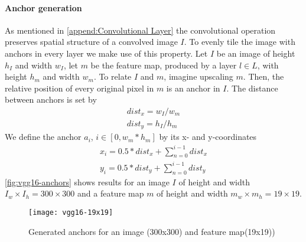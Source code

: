 \paragraph{Anchor generation} 
As mentioned in \autoref{append:Convolutional Layer} the convolutional 
operation preserves spatial structure of a convolved image \(I\). To evenly 
tile the image with \glspl{anchor} in every \gls{layer} we make use of this property. 
Let \(I\) be an image of height \(h_I\) and width \(w_I\), let \(m\) be the 
\gls{feature map}, produced by a \gls{layer} \(l\in L\), with height \(h_m\) and
width \(w_m\). To relate \(I\) and \(m\), imagine upscaling \(m\). Then, 
the relative position of every original pixel in \(m\) is an \gls{anchor} in 
\(I\). The distance between
\glspl{anchor} is set by 
\begin{gather}
    dist_x=w_I/w_m\\
    dist_y=h_I/h_m
\end{gather}
We define the anchor \(a_i\), \(i\in [0, w_m*h_m]\) by its x- and y-coordinates 
\begin{gather}
    x_i=0.5*dist_x + \sum_{n=0}^{i-1} dist_x\\
    y_i=0.5*dist_y + \sum_{n=0}^{i-1} dist_y
\end{gather}
\autoref{fig:vgg16-anchors} shows results for an image \(I\) of height and width
\(I_w\times I_h=300\times 300\) and a \gls{feature map} \(m\) of height and
width \(m_w\times m_h=19\times 19\).
\begin{figure}[ht]
    \centering
    \texttt{[image: vgg16-19x19]}
    \caption{Generated anchors for an image (300x300) and \gls{feature map}(19x19))}
    \label{fig:vgg16-anchors}
\end{figure}

